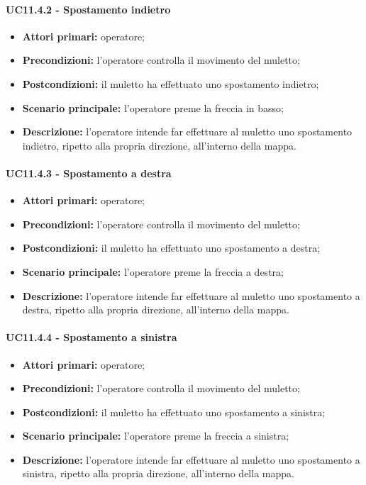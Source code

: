 \paragraph{UC11.4.2 - Spostamento indietro}
\begin{itemize}
	\item 	\textbf{Attori primari:} operatore;
	\item 	\textbf{Precondizioni:} l'operatore controlla il movimento del muletto;
	\item 	\textbf{Postcondizioni:} il muletto ha effettuato uno spostamento indietro; 
	\item 	\textbf{Scenario principale:} l'operatore preme la freccia in basso;
	\item 	\textbf{Descrizione:} l'operatore intende far effettuare al muletto uno spostamento indietro, ripetto alla propria direzione, all'interno della mappa.
\end{itemize}

\paragraph{UC11.4.3 - Spostamento a destra}
\begin{itemize}
	\item 	\textbf{Attori primari:} operatore;
	\item 	\textbf{Precondizioni:} l'operatore controlla il movimento del muletto;
	\item 	\textbf{Postcondizioni:} il muletto ha effettuato uno spostamento a destra; 
	\item 	\textbf{Scenario principale:} l'operatore preme la freccia a destra;
	\item 	\textbf{Descrizione:} l'operatore intende far effettuare al muletto uno spostamento a destra, ripetto alla propria direzione, all'interno della mappa.

\end{itemize}

\paragraph{UC11.4.4 - Spostamento a sinistra}
\begin{itemize}
	\item 	\textbf{Attori primari:} operatore;
	\item 	\textbf{Precondizioni:} l'operatore controlla il movimento del muletto;
	\item 	\textbf{Postcondizioni:} il muletto ha effettuato uno spostamento a sinistra; 
	\item 	\textbf{Scenario principale:} l'operatore preme la freccia a sinistra;
	\item 	\textbf{Descrizione:} l'operatore intende far effettuare al muletto uno spostamento a sinistra, ripetto alla propria direzione, all'interno della mappa.
\end{itemize}


